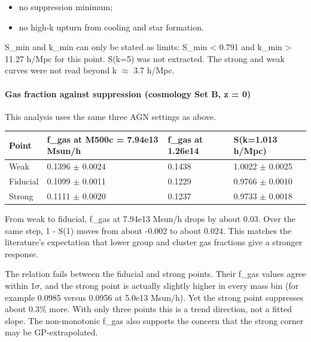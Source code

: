 \documentclass[11pt,a4paper]{article}
\begin{document}
\begin{itemize}
  \item no suppression minimum;
  \item no high-k upturn from cooling and star formation.
\end{itemize}
S\_min and k\_min can only be stated as limits: S\_min \textless{} 0.791 and k\_min \textgreater{} 11.27 h/Mpc for this point. S(k=5) was not extracted. The strong and weak curves were not read beyond k $\approx$ 3.7 h/Mpc.

\paragraph{Gas fraction against suppression (cosmology Set B, z = 0)}
This analysis uses the same three AGN settings as above.

\begin{longtable}{@{}p{}p{}p{}p{}@{}}
\toprule
\textbf{Point} & \textbf{f\_gas at M500c = 7.94e13 Msun/h} & \textbf{f\_gas at 1.26e14} & \textbf{S(k=1.013 h/Mpc)} \\ \midrule \endhead
Weak & 0.1396 $\pm$ 0.0024 & 0.1438 & 1.0022 $\pm$ 0.0025 \\
Fiducial & 0.1099 $\pm$ 0.0011 & 0.1229 & 0.9766 $\pm$ 0.0010 \\
Strong & 0.1111 $\pm$ 0.0020 & 0.1237 & 0.9733 $\pm$ 0.0018 \\
\bottomrule\end{longtable}
From weak to fiducial, f\_gas at 7.94e13 Msun/h drops by about 0.03. Over the same step, 1 - S(1) moves from about -0.002 to about 0.024. This matches the literature's expectation that lower group and cluster gas fractions give a stronger response.

The relation fails between the fiducial and strong points. Their f\_gas values agree within 1$\sigma$, and the strong point is actually slightly higher in every mass bin (for example 0.0985 versus 0.0956 at 5.0e13 Msun/h). Yet the strong point suppresses about 0.3\% more. With only three points this is a trend direction, not a fitted slope. The non-monotonic f\_gas also supports the concern that the strong corner may be GP-extrapolated.
\end{document}
